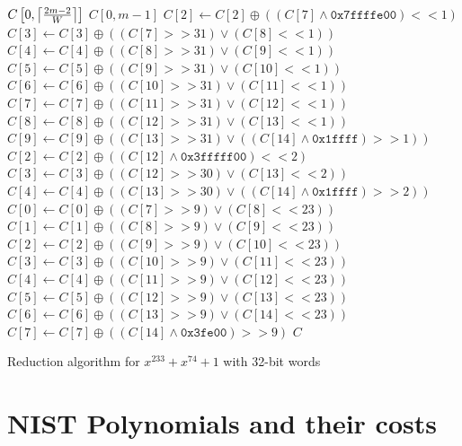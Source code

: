 \begin{algorithm}
\begin{algorithmic}[1]
  \REQUIRE $C\left[0,\ceil*{\frac{2m-2}{W}}\right]$
  \ENSURE $C[0,m-1]$
  \STATE $C[2] \gets C[2] \oplus ((C[7] \land \texttt{0x7ffffe00}) << 1)$
  \STATE $C[3] \gets C[3] \oplus ((C[7] >> 31) \lor (C[8] << 1))$
  \STATE $C[4] \gets C[4] \oplus ((C[8] >> 31) \lor (C[9] << 1))$
  \STATE $C[5] \gets C[5] \oplus ((C[9] >> 31) \lor (C[10] << 1))$
  \STATE $C[6] \gets C[6] \oplus ((C[10] >> 31) \lor (C[11] << 1))$
  \STATE $C[7] \gets C[7] \oplus ((C[11] >> 31) \lor (C[12] << 1))$
  \STATE $C[8] \gets C[8] \oplus ((C[12] >> 31) \lor (C[13] << 1))$
  \STATE $C[9] \gets C[9] \oplus ((C[13] >> 31) \lor ((C[14] \land \texttt{0x1ffff}) >> 1))$
  \STATE $C[2] \gets C[2] \oplus ((C[12] \land \texttt{0x3fffff00}) << 2)$
  \STATE $C[3] \gets C[3] \oplus ((C[12] >> 30) \lor (C[13] << 2))$
  \STATE $C[4] \gets C[4] \oplus ((C[13] >> 30) \lor ((C[14] \land \texttt{0x1ffff}) >> 2))$
  \STATE $C[0] \gets C[0] \oplus ((C[7] >> 9) \lor (C[8] << 23))$
  \STATE $C[1] \gets C[1] \oplus ((C[8] >> 9) \lor (C[9] << 23))$
  \STATE $C[2] \gets C[2] \oplus ((C[9] >> 9) \lor (C[10] << 23))$
  \STATE $C[3] \gets C[3] \oplus ((C[10] >> 9) \lor (C[11] << 23))$
  \STATE $C[4] \gets C[4] \oplus ((C[11] >> 9) \lor (C[12] << 23))$
  \STATE $C[5] \gets C[5] \oplus ((C[12] >> 9) \lor (C[13] << 23))$
  \STATE $C[6] \gets C[6] \oplus ((C[13] >> 9) \lor (C[14] << 23))$
  \STATE $C[7] \gets C[7] \oplus ((C[14] \land \texttt{0x3fe00}) >> 9)$
  \RETURN $C$
  \caption{Reduction algorithm for $x^{233} + x^{74} + 1$ with 32-bit words}
  \label{alg:233-32:word:operation}
\end{algorithmic}
\end{algorithm}




\section{NIST Polynomials and their costs}

